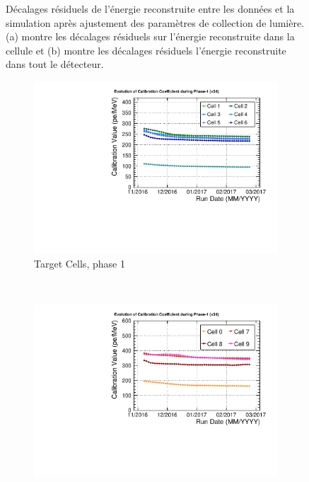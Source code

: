 {\begin{figure}[h!]
\begin{subfigure}[b]{0.49\textwidth}
\end{subfigure}
  \caption[Décalages résiduels de l'énergie reconstruite entre les données et la simulation après ajustement des paramètres de collection de lumière]{Décalages résiduels de l'énergie reconstruite entre les données et la simulation après ajustement des paramètres de collection de lumière. (a) montre les décalages résiduels sur l'énergie reconstruite dans la cellule et (b) montre les décalages résiduels l'énergie reconstruite dans tout le détecteur.}
  \label{fig:Erec_vs_anchor_vs_time}
\end{figure}

\begin{figure}[h!]

\centering

\begin{subfigure}[b]{0.49\textwidth}
\centering
\includegraphics[width=1\textwidth]{images/CC_running_T_p1.pdf}
\caption{Target Cells, phase 1}
\label{fig:CC_running_T_p1.pdf}
\end{subfigure}
~ %
\begin{subfigure}[b]{0.49\textwidth}
\centering
\includegraphics[width=1\textwidth]{images/CC_running_GC_p1.pdf}

\end{subfigure}
\end{figure}}
